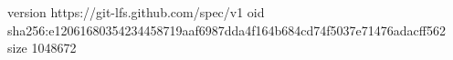 version https://git-lfs.github.com/spec/v1
oid sha256:e12061680354234458719aaf6987dda4f164b684cd74f5037e71476adacff562
size 1048672
